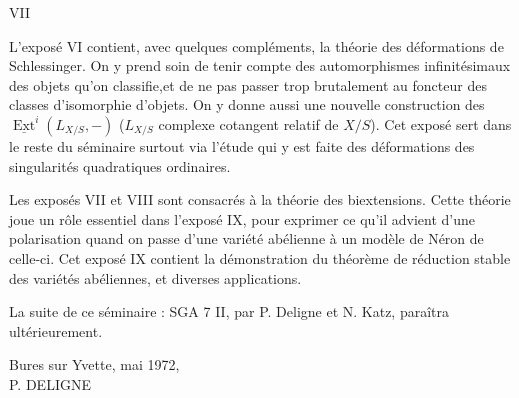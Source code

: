 \clearpage
\thispagestyle{empty}
\begin{center}
VII
\end{center}

L'exposé VI contient, avec quelques compléments, la théorie des déformations
de Schlessinger. On y prend soin de tenir compte des automorphismes infinitésimaux
des objets qu'on classifie,et de ne pas passer trop brutalement au foncteur des classes
d'isomorphie d'objets. On y donne aussi une nouvelle construction des
$\underline{\operatorname{Ext}}^{i}(L_{X/S},-)$ ($L_{X/S}$ complexe cotangent relatif de $X/S$). Cet exposé sert dans le
reste du séminaire surtout via l'étude qui y est faite des déformations des singularités
quadratiques ordinaires.

Les exposés VII et VIII sont consacrés à la théorie des biextensions. Cette
théorie joue un rôle essentiel dans l'exposé IX, pour exprimer ce qu'il advient d'une
polarisation quand on passe d'une variété abélienne à un modèle de Néron de celle-ci.
Cet exposé IX contient la démonstration du théorème de réduction stable des variétés
abéliennes, et diverses applications.

La suite de ce séminaire : SGA 7 II, par P. Deligne et N. Katz, paraîtra
ultérieurement.

\begin{flushright}
Bures sur Yvette, mai 1972,\\
P. DELIGNE
\end{flushright}
